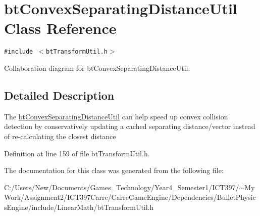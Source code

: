 \hypertarget{classbt_convex_separating_distance_util}{
\section{btConvexSeparatingDistanceUtil Class Reference}
\label{classbt_convex_separating_distance_util}
}
{\tt \#include $<$btTransformUtil.h$>$}

Collaboration diagram for btConvexSeparatingDistanceUtil:

\subsection{Detailed Description}
The \hyperlink{classbt_convex_separating_distance_util}{btConvexSeparatingDistanceUtil} can help speed up convex collision detection by conservatively updating a cached separating distance/vector instead of re-calculating the closest distance 

Definition at line 159 of file btTransformUtil.h.

The documentation for this class was generated from the following file:\begin{CompactItemize}
\item 
C:/Users/New/Documents/Games\_\-Technology/Year4\_\-Semester1/ICT397/$\sim$My Work/Assignment2/ICT397Carre/CarreGameEngine/Dependencies/BulletPhysicsEngine/include/LinearMath/btTransformUtil.h\end{CompactItemize}
